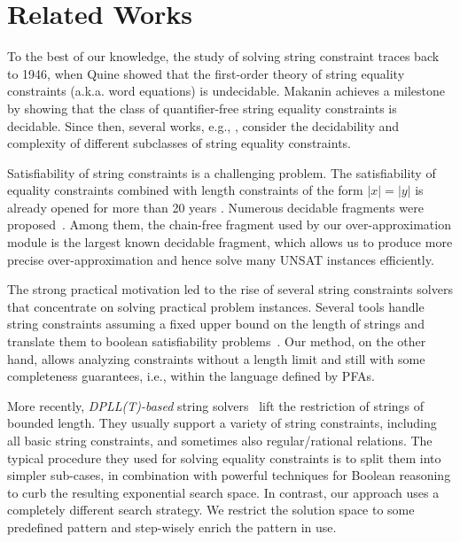\documentclass[sigplan,screen]{acmart}
\begin{document}




\section{Related Works} 
\label{section:related}
To the best of our knowledge, the study of solving string constraint traces back to 1946, when Quine \cite{quine1946concatenation} showed that the first-order theory of string equality constraints (a.k.a. word equations) is undecidable. Makanin achieves a milestone \cite{makanin1977problem} by showing that the class of quantifier-free string equality constraints is decidable.
Since then, several works, e.g., \cite{plandowski1999satisfiability,plandowski2006efficient,matiyasevich2008computation,robson1999quadratic,schulz1990makanin,ganesh2012word,ganesh2016undecidability}, consider the decidability and complexity of different subclasses of string equality constraints. 

Satisfiability of string constraints is a challenging problem. The satisfiability of equality constraints combined with length constraints of the form $|x|=|y|$ is already opened for more than 20 years \cite{buchi1990definability}.
Numerous decidable fragments were proposed~\cite{abdulla2014string,barcelo2013graph,lin2016string,chen2017decidable,chen2019decision,abdulla2019chain}. Among them, the chain-free fragment \cite{abdulla2019chain} used by our over-approximation module is the largest known decidable fragment, which allows us to produce more precise over-approximation and hence solve many UNSAT instances efficiently.

The strong practical motivation led to the rise of several string constraints solvers that concentrate on solving practical problem instances. Several tools handle string constraints assuming a fixed upper bound on the length of strings and translate them to boolean satisfiability problems~\cite{kiezun2009hampi,saxena2010symbolic,saxena2010flax}.  Our method, on the other hand, allows analyzing constraints without a length limit and still with some completeness guarantees, i.e., within the language defined by PFAs.

More recently,  {\it DPLL(T)-based} string solvers~\cite{berzish2017z3str3,zheng2017z3str2,cvc4Tool,trinh2014s3,trinh2016progressive,abdulla2015norn,abdulla2018trau,sloth,chen2019decision} lift the
restriction of strings of bounded length. They usually support a variety of string constraints, including all basic string constraints, and sometimes also regular/rational relations. 
The typical procedure they used for solving equality constraints is to split them into simpler sub-cases, in combination with powerful techniques for Boolean reasoning to curb the resulting exponential search space. In contrast, our approach uses a completely different search strategy. We restrict the solution space to some predefined pattern and step-wisely enrich the pattern in use.
\end{document}
